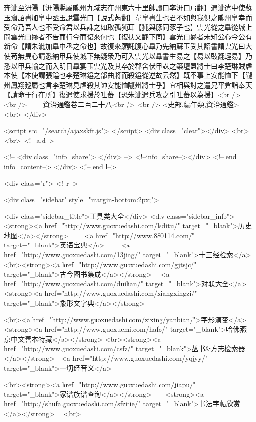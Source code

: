 奔泚至汧陽【汧陽縣屬隴州九域志在州東六十里帥讀曰率汧口肩翻】遇泚遣中使蘇玉齎詔書加臯中丞玉說雲光曰【說式芮翻】韋臯書生也君不如與我俱之隴州臯幸而受命乃吾人也不受命君以兵誅之如取孤㹠耳【㹠與豚同豕子也】雲光從之臯從城上問雲光曰曏者不告而行今而復來何也【復扶又翻下同】雲光曰曏者未知公心今公有新命【謂朱泚加臯中丞之命也】故復來願託腹心臯乃先納蘇玉受其詔書謂雲光曰大使苟無異心請悉納甲兵使城下無疑衆乃可入雲光以臯書生易之【易以豉翻輕易】乃悉以甲兵輸之而入明日臯宴玉雲光及其卒於郡舍伏甲誅之築壇盟將士曰李楚琳賊虐本使【本使謂張鎰也李楚琳鎰之部曲將而殺鎰從逆故云然】既不事上安能恤下【隴州鳳翔廵屬也言李楚琳見虐殺其帥安能恤隴州將士乎】宜相與討之遣兄平弇詣奉天【請命于行在所】復遣使求援於吐蕃【恐朱泚遣兵攻之引吐蕃以為援】<br />
<br />
　　資治通鑑卷二百二十八<br />
<br />
<史部,編年類,資治通鑑>  <br>
   </div> 

<script src="/search/ajaxskft.js"> </script>
 <div class="clear"></div>
<br>
<br>
 <!-- a.d-->

 <!--
<div class="info_share">
</div> 
-->
 <!--info_share--></div>   <!-- end info_content-->
  </div> <!-- end l-->

<div class="r">   <!--r-->



<div class="sidebar"  style="margin-bottom:2px;">

 
<div class="sidebar_title">工具类大全</div>
<div class="sidebar_info">
<strong><a href="http://www.guoxuedashi.com/lsditu/" target="_blank">历史地图</a></strong>　　
<a href="http://www.880114.com/" target="_blank">英语宝典</a>　　
<a href="http://www.guoxuedashi.com/13jing/" target="_blank">十三经检索</a>　
<br><strong><a href="http://www.guoxuedashi.com/gjtsjc/" target="_blank">古今图书集成</a></strong>　
<a href="http://www.guoxuedashi.com/duilian/" target="_blank">对联大全</a>　<strong><a href="http://www.guoxuedashi.com/xiangxingzi/" target="_blank">象形文字典</a></strong>　

<br><a href="http://www.guoxuedashi.com/zixing/yanbian/">字形演变</a>　　<strong><a href="http://www.guoxuemi.com/hafo/" target="_blank">哈佛燕京中文善本特藏</a></strong>
<br><strong><a href="http://www.guoxuedashi.com/csfz/" target="_blank">丛书&方志检索器</a></strong>　<a href="http://www.guoxuedashi.com/yqjyy/" target="_blank">一切经音义</a>　　

<br><strong><a href="http://www.guoxuedashi.com/jiapu/" target="_blank">家谱族谱查询</a></strong>　　<strong><a href="http://shufa.guoxuedashi.com/sfzitie/" target="_blank">书法字帖欣赏</a></strong>　
<br>

